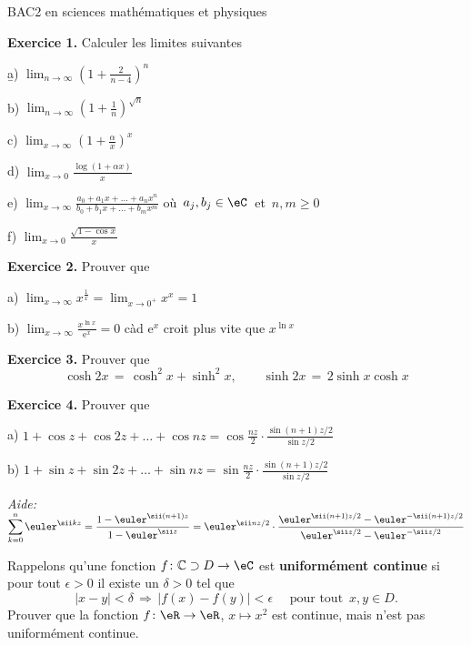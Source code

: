 \begin{bf}
\begin{center}
BAC2 en sciences mathématiques et physiques
\end{center}
\end{bf}

{\bf Exercice 1.} Calculer les limites suivantes

\b
a) $\displaystyle \lim_{n \to \infty} \left( 1+ \frac{2}{n-4} \right)^n$

\medskip
b) 
$\displaystyle \lim_{n \to \infty}
         \left( 1+ \frac 1n \right)^{\sqrt{n}}$

\medskip
c)  $\displaystyle \lim_{x \to \infty}
    \left( 1+ \frac \alpha x \right)^x$

\medskip
d) 
$\displaystyle \lim_{x \to 0} \frac{\log \left( 1+ \alpha x \right)}{x}$


\medskip
e) 
$\displaystyle \lim_{x \to \infty}
\frac{a_0+a_1x + \dots +a_nx^n}{b_0+b_1x + \dots +b_mx^m}$
\quad où\, $a_j, b_j \in \eC$ \,et\, $n,m \ge 0$

\medskip
f) 
$\displaystyle \lim_{x \to 0} \frac{\sqrt{1-\cos x}}{x}$




{\bf Exercice 2.} Prouver que

\medskip
a)
$\displaystyle \lim_{x \to \infty} x^{\frac 1x} = \lim_{x \to 0^+} x^x = 1$

\medskip
b)
$\displaystyle \lim_{x \to \infty} \frac{x^{\ln x}}{{\mathrm e}^x} =0$
\quad
càd ${\mathrm e}^x$ croit plus vite que $x^{\ln x}$


{\bf Exercice 3.} Prouver que
$$
\cosh 2x \,=\, \cosh^2 x + \sinh^2 x,
\qquad
\sinh 2x \,=\, 2 \sinh x \cosh x
$$


{\bf Exercice 4.} Prouver que

a)
$1 + \cos z + \cos 2z + \dots + \cos nz = \displaystyle \cos \frac{nz}{2} \cdot \frac{\sin (n+1)z/2}{\sin z/2}$

b)
$1 + \sin z + \sin 2z + \dots + \sin nz = \displaystyle \sin \frac{nz}{2} \cdot \frac{\sin (n+1)z/2}{\sin z/2}$

{\it Aide:}\;
$\displaystyle \sum_{k=0}^n
\euler^{\sii kz}
=
\frac{1-\euler^{\sii (n+1)z}}{1-\euler^{\sii z}}
= \euler^{\sii nz/2} \cdot \frac{\euler^{\sii (n+1)z/2} - \euler^{-\sii (n+1)z/2}}{
\euler^{\sii z/2}-\euler^{-\sii z/2}}
$

Rappelons qu'une fonction $f \colon \mathbb{C} \supset D \to \eC$ est {\bf uniformément continue} si pour tout $\epsilon >0$ il existe un \( \delta>0\) tel que
$$
|x-y| < \delta \,\Longrightarrow\, |f(x)-f(y)| < \epsilon
\quad \text{ pour tout }\, x,y \in D.
$$
Prouver que la fonction $f \colon \eR \to \eR$, $x \mapsto x^2$ est continue, mais n'est pas uniformément continue.


